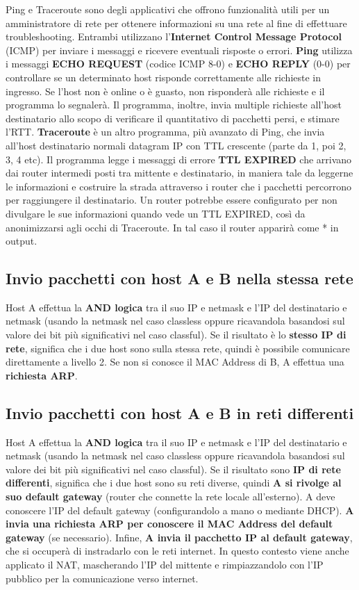\documentclass[12pt]{article}
\begin{document}
Ping e Traceroute sono degli applicativi che offrono funzionalità utili per un amministratore di rete per ottenere informazioni su una rete al fine di effettuare troubleshooting. Entrambi utilizzano l'\textbf{Internet Control Message Protocol} (ICMP) per inviare i messaggi e ricevere eventuali risposte o errori. \textbf{Ping} utilizza i messaggi \textbf{ECHO REQUEST} (codice ICMP 8-0) e \textbf{ECHO REPLY} (0-0) per controllare se un determinato host risponde correttamente alle richieste in ingresso. Se l'host non è online o è guasto, non risponderà alle richieste e il programma lo segnalerà. Il programma, inoltre, invia multiple richieste all'host destinatario allo scopo di verificare il quantitativo di pacchetti persi, e stimare l'RTT. \textbf{Traceroute} è un altro programma, più avanzato di Ping, che invia all'host destinatario normali datagram IP con TTL crescente (parte da 1, poi 2, 3, 4 etc). Il programma legge i messaggi di errore \textbf{TTL EXPIRED} che arrivano dai router intermedi posti tra mittente e destinatario, in maniera tale da leggerne le informazioni e costruire la strada attraverso i router che i pacchetti percorrono per raggiungere il destinatario. Un router potrebbe essere configurato per non divulgare le sue informazioni quando vede un TTL EXPIRED, così da anonimizzarsi agli occhi di Traceroute. In tal caso il router apparirà come * in output.

\subsection{Invio pacchetti con host A e B nella stessa rete}

Host A effettua la \textbf{AND logica} tra il suo IP e netmask e l'IP del destinatario e netmask (usando la netmask nel caso classless oppure ricavandola basandosi sul valore dei bit più significativi nel caso classful). Se il risultato è lo \textbf{stesso IP di rete}, significa che i due host sono sulla stessa rete, quindi è possibile comunicare direttamente a livello 2. Se non si conosce il MAC Address di B, A effettua una \textbf{richiesta ARP}.

\subsection{Invio pacchetti con host A e B in reti differenti}

Host A effettua la \textbf{AND logica} tra il suo IP e netmask e l'IP del destinatario e netmask (usando la netmask nel caso classless oppure ricavandola basandosi sul valore dei bit più significativi nel caso classful). Se il risultato sono \textbf{IP di rete differenti}, significa che i due host sono su reti diverse, quindi \textbf{A si rivolge al suo default gateway} (router che connette la rete locale all'esterno). A deve conoscere l'IP del default gateway (configurandolo a mano o mediante DHCP). \textbf{A invia una richiesta ARP per conoscere il MAC Address del default gateway} (se necessario). Infine, \textbf{A invia il pacchetto IP al default gateway}, che si occuperà di instradarlo con le reti internet. In questo contesto viene anche applicato il NAT, mascherando l'IP del mittente e rimpiazzandolo con l'IP pubblico per la comunicazione verso internet.
\end{document}
